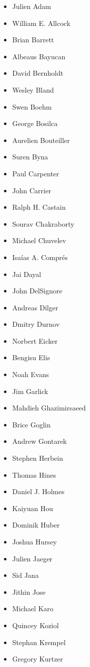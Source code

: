\begin{itemize}
    \item Julien Adam
    \item William E. Allcock
    \item Brian Barrett
    \item Albeaus Bayucan
    \item David Bernholdt
    \item Wesley Bland
    \item Swen Boehm
    \item George Bosilca
    \item Aurelien Bouteiller
    \item Suren Byna
    \item Paul Carpenter
    \item John Carrier
    \item Ralph H. Castain
    \item Sourav Chakraborty
    \item Michael Chuvelev
    \item Isaías A. Comprés
    \item Jai Dayal
    \item John DelSignore
    \item Andreas Dilger
    \item Dmitry Durnov
    \item Norbert Eicker
    \item Bengisu Elis
    \item Noah Evans
    \item Jim Garlick
    \item Mahdieh Ghazimirsaeed
    \item Brice Goglin
    \item Andrew Gontarek
    \item Stephen Herbein
    \item Thomas Hines
    \item Daniel J. Holmes
    \item Kaiyuan Hou
    \item Dominik Huber
    \item Joshua Hursey
    \item Julien Jaeger
    \item Sid Jana
    \item Jithin Jose
    \item Michael Karo
    \item Quincey Koziol
    \item Stephan Krempel
    \item Gregory Kurtzer

\end{itemize}
